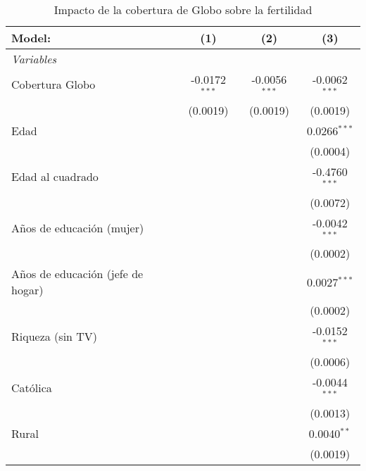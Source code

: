 
\begin{table}[H]
   \caption{\label{tab:globo_fertilidad} Impacto de la cobertura de Globo sobre la fertilidad}
   \centering
   \begin{tabular}{lccc}
      \tabularnewline \midrule \midrule
      Model:                            & (1)             & (2)             & (3)\\  
      \midrule
      \emph{Variables}\\
      Cobertura Globo                   & -0.0172$^{***}$ & -0.0056$^{***}$ & -0.0062$^{***}$\\   
                                        & (0.0019)        & (0.0019)        & (0.0019)\\   
      Edad                              &                 &                 & 0.0266$^{***}$\\   
                                        &                 &                 & (0.0004)\\   
      Edad al cuadrado                  &                 &                 & -0.4760$^{***}$\\   
                                        &                 &                 & (0.0072)\\   
      Años de educación (mujer)         &                 &                 & -0.0042$^{***}$\\   
                                        &                 &                 & (0.0002)\\   
      Años de educación (jefe de hogar) &                 &                 & 0.0027$^{***}$\\   
                                        &                 &                 & (0.0002)\\   
      Riqueza (sin TV)                  &                 &                 & -0.0152$^{***}$\\   
                                        &                 &                 & (0.0006)\\   
      Católica                          &                 &                 & -0.0044$^{***}$\\   
                                        &                 &                 & (0.0013)\\   
      Rural                             &                 &                 & 0.0040$^{**}$\\   
                                        &                 &                 & (0.0019)\\   

\end{tabular}
\end{table}
